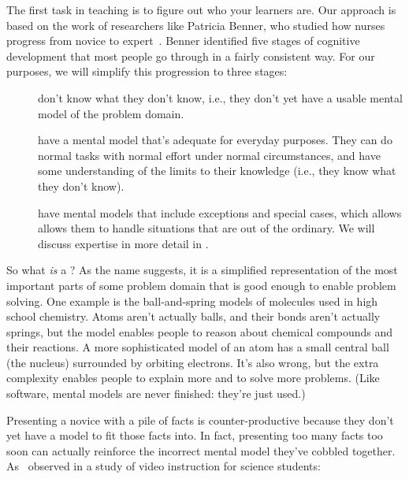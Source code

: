 
The first task in teaching is to figure out who your learners are.
Our approach is based on the work of researchers like Patricia Benner,
who studied how nurses progress from novice to expert~\cite{Benn2000}.
Benner identified five stages of cognitive development that most people go through in a fairly consistent way.
For our purposes, we will simplify this progression to three stages:

\begin{description}

\item[]
  don't know what they don't know,
  i.e., they don't yet have a usable mental model of the problem domain.

\item[]
  have a mental model that's adequate for everyday purposes.
  They can do normal tasks with normal effort under normal circumstances,
  and have some understanding of the limits to their knowledge
  (i.e., they know what they don't know).

\item[]
  have mental models that include exceptions and special cases,
  which allows allows them to handle situations that are out of the ordinary.
  We will discuss expertise in more detail in .

\end{description}

So what \emph{is} a ?
As the name suggests,
it is a simplified representation of the most important parts of some problem domain
that is good enough to enable problem solving.
One example is the ball-and-spring models of molecules used in high school chemistry.
Atoms aren't actually balls,
and their bonds aren't actually springs,
but the model enables people to reason about chemical compounds and their reactions.
A more sophisticated model of an atom has a small central ball (the nucleus) surrounded by orbiting electrons.
It's also wrong,
but the extra complexity enables people to explain more and to solve more problems.
(Like software,
mental models are never finished:
they're just used.)

Presenting a novice with a pile of facts is counter-productive
because they don't yet have a model to fit those facts into.
In fact,
presenting too many facts too soon can actually reinforce
the incorrect mental model they've cobbled together.
As~\cite{Mull2007a} observed in a study of video instruction for science students:

